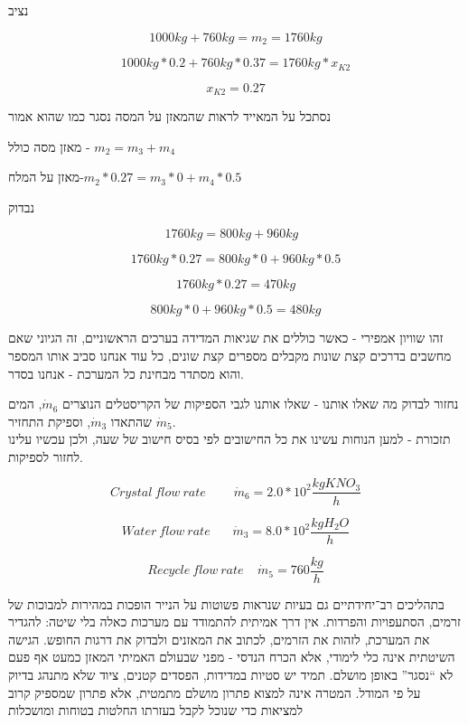 \documentclass[
  hebrew,
  letterpaper,
  DIV=11,
  numbers=noendperiod]{scrreprt}
\begin{document}
\begin{tcolorbox}
נציב

\[1000kg + 760kg = \boxed{m_{2} = 1760kg}\]

\[1000kg*0.2 + 760kg*0.37 = 1760kg*x_{K2}\]

\[x_{K2} = 0.27\]

נסתכל על המאייד לראות שהמאזן על המסה נסגר כמו שהוא אמור

מאזן מסה כולל - \(m_{2} = m_{3} + m_{4}\)

מאזן על המלח-\(m_{2}*0.27 = m_{3}*0 + m_{4}*0.5\)

נבדוק

\[1760kg = 800kg + 960kg\ \ \ \]

\[1760kg*0.27 = 800kg*0 + 960kg*0.5\]

\[1760kg*0.27 = 470kg\]

\[800kg*0 + 960kg*0.5 = 480kg\]

\end{tcolorbox}

\begin{tcolorbox}[enhanced jigsaw, colback=white, arc=.35mm, coltitle=black, breakable, toptitle=1mm, leftrule=.75mm, colbacktitle=quarto-callout-tip-color!10!white, opacitybacktitle=0.6, bottomtitle=1mm, titlerule=0mm, opacityback=0, colframe=quarto-callout-tip-color-frame, title=\textcolor{quarto-callout-tip-color}{\faLightbulb}\hspace{0.5em}{עצה}, rightrule=.15mm, bottomrule=.15mm, toprule=.15mm, left=2mm]

זהו שוויון אמפירי - כאשר כוללים את שגיאות המדידה בערכים הראשוניים, זה
הגיוני שאם מחשבים בדרכים קצת שונות מקבלים מספרים קצת שונים, כל עוד אנחנו
סביב אותו המספר והוא מסתדר מבחינת כל המערכת - אנחנו בסדר.

\end{tcolorbox}

נחזור לבדוק מה שאלו אותנו - שאלו אותנו לגבי הספיקות של הקריסטלים הנוצרים
\({\dot{m}}_{6}\), המים שהתאדו \({\dot{m}}_{3}\), וספיקת התחזיר
\({\dot{m}}_{5}\).\\
תזכורת - למען הנוחות עשינו את כל החישובים לפי בסיס חישוב של שעה, ולכן
עכשיו עלינו לחזור לספיקות.

\[Crystal\ flow\ rate\ \ \ \ \ \ \ \ \ \ {\dot{m}}_{6} = 2.0*10^{2}\frac{kgKNO_{3}}{h}\]

\[Water\ flow\ rate\ \ \ \ \ \ \ \ {\dot{m}}_{3} = 8.0*10^{2}\frac{kgH_{2}O}{h}\]

\[Recycle\ flow\ rate\ \ \ \ \ {\dot{m}}_{5} = 760\frac{kg}{h}\]

בתהליכים רב־יחידתיים גם בעיות שנראות פשוטות על הנייר הופכות במהירות
למבוכות של זרמים, הסתעפויות והפרדות. אין דרך אמיתית להתמודד עם מערכות
כאלה בלי שיטה: להגדיר את המערכת, לזהות את הזרמים, לכתוב את המאזנים
ולבדוק את דרגות החופש. הגישה השיטתית אינה כלי לימודי, אלא הכרח הנדסי -
מפני שבעולם האמיתי המאזן כמעט אף פעם לא ``נסגר'' באופן מושלם. תמיד יש
סטיות במדידות, הפסדים קטנים, ציוד שלא מתנהג בדיוק על פי המודל. המטרה
אינה למצוא פתרון מושלם מתמטית, אלא פתרון שמספיק קרוב למציאות כדי שנוכל
לקבל בעזרתו החלטות בטוחות ומושכלות
\end{document}
